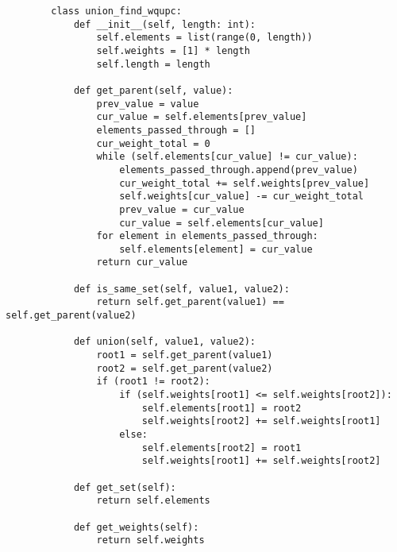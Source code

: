     \begin{lstlisting}
        class union_find_wqupc:
            def __init__(self, length: int):
                self.elements = list(range(0, length))
                self.weights = [1] * length
                self.length = length

            def get_parent(self, value):
                prev_value = value
                cur_value = self.elements[prev_value]
                elements_passed_through = []
                cur_weight_total = 0
                while (self.elements[cur_value] != cur_value):
                    elements_passed_through.append(prev_value)
                    cur_weight_total += self.weights[prev_value]
                    self.weights[cur_value] -= cur_weight_total
                    prev_value = cur_value
                    cur_value = self.elements[cur_value]
                for element in elements_passed_through:
                    self.elements[element] = cur_value
                return cur_value

            def is_same_set(self, value1, value2):
                return self.get_parent(value1) == self.get_parent(value2)
            
            def union(self, value1, value2):
                root1 = self.get_parent(value1)
                root2 = self.get_parent(value2)
                if (root1 != root2):
                    if (self.weights[root1] <= self.weights[root2]):
                        self.elements[root1] = root2
                        self.weights[root2] += self.weights[root1]
                    else:
                        self.elements[root2] = root1
                        self.weights[root1] += self.weights[root2]

            def get_set(self):
                return self.elements
            
            def get_weights(self):
                return self.weights
    \end{lstlisting}








